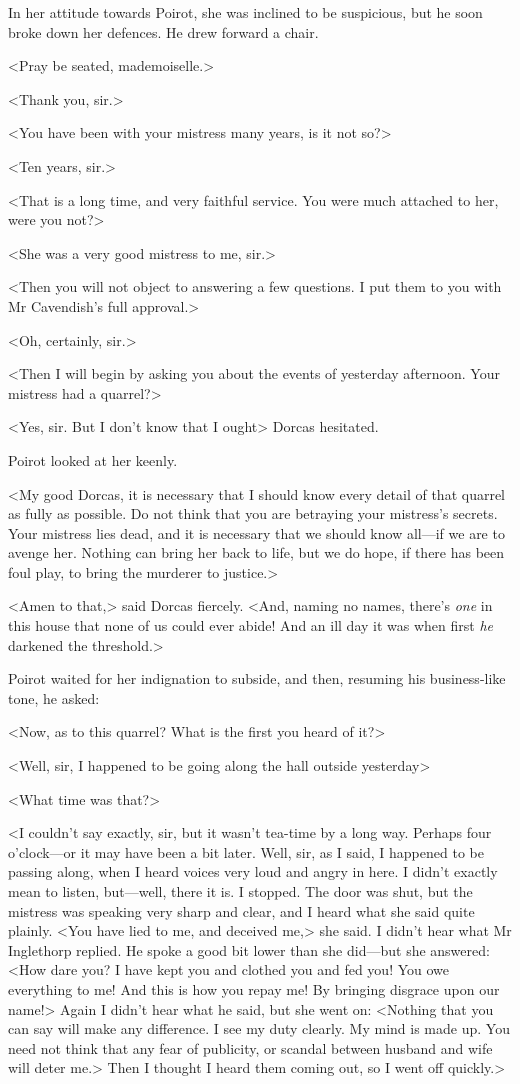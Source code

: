  In her attitude towards Poirot, she was inclined to be suspicious, but he soon broke down her defences. He drew forward a chair. 

 <Pray be seated, mademoiselle.> 

 <Thank you, sir.> 

 <You have been with your mistress many years, is it not so?> 

 <Ten years, sir.> 

 <That is a long time, and very faithful service. You were much attached to her, were you not?> 

 <She was a very good mistress to me, sir.> 

 <Then you will not object to answering a few questions. I put them to you with Mr Cavendish's full approval.> 

 <Oh, certainly, sir.> 

 <Then I will begin by asking you about the events of yesterday afternoon. Your mistress had a quarrel?> 

 <Yes, sir. But I don't know that I ought\longdash> Dorcas hesitated. 

 Poirot looked at her keenly. 

 <My good Dorcas, it is necessary that I should know every detail of that quarrel as fully as possible. Do not think that you are betraying your mistress's secrets. Your mistress lies dead, and it is necessary that we should know all—if we are to avenge her. Nothing can bring her back to life, but we do hope, if there has been foul play, to bring the murderer to justice.> 

 <Amen to that,> said Dorcas fiercely. <And, naming no names, there's \emph{one} in this house that none of us could ever abide! And an ill day it was when first \emph{he} darkened the threshold.> 

 Poirot waited for her indignation to subside, and then, resuming his business-like tone, he asked: 

 <Now, as to this quarrel? What is the first you heard of it?> 

 <Well, sir, I happened to be going along the hall outside yesterday\longdash> 

 <What time was that?> 

 <I couldn't say exactly, sir, but it wasn't tea-time by a long way. Perhaps four o'clock—or it may have been a bit later. Well, sir, as I said, I happened to be passing along, when I heard voices very loud and angry in here. I didn't exactly mean to listen, but—well, there it is. I stopped. The door was shut, but the mistress was speaking very sharp and clear, and I heard what she said quite plainly. <You have lied to me, and deceived me,> she said. I didn't hear what Mr Inglethorp replied. He spoke a good bit lower than she did—but she answered: <How dare you? I have kept you and clothed you and fed you! You owe everything to me! And this is how you repay me! By bringing disgrace upon our name!> Again I didn't hear what he said, but she went on: <Nothing that you can say will make any difference. I see my duty clearly. My mind is made up. You need not think that any fear of publicity, or scandal between husband and wife will deter me.> Then I thought I heard them coming out, so I went off quickly.> 

